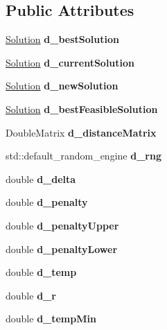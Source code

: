 \subsection*{Public Attributes}
\begin{DoxyCompactItemize}
\item 
\mbox{\label{class_env_a200b43f8ef6487fd256326a549616e78}} 
\hyperlink{class_solution}{Solution} {\bfseries d\+\_\+best\+Solution}
\item 
\mbox{\label{class_env_a60f53202173a69954e643ef46f16062f}} 
\hyperlink{class_solution}{Solution} {\bfseries d\+\_\+current\+Solution}
\item 
\mbox{\label{class_env_a6109a75656bf4b55567e57369d7b5aa5}} 
\hyperlink{class_solution}{Solution} {\bfseries d\+\_\+new\+Solution}
\item 
\mbox{\label{class_env_a639c27f323c898cb9821f4c64b1a055a}} 
\hyperlink{class_solution}{Solution} {\bfseries d\+\_\+best\+Feasible\+Solution}
\item 
\mbox{\label{class_env_a2686d42335dbafb9c10ebdbe6362e613}} 
Double\+Matrix {\bfseries d\+\_\+distance\+Matrix}
\item 
\mbox{\label{class_env_acde21783d6aed785a78cf914a7215383}} 
std\+::default\+\_\+random\+\_\+engine {\bfseries d\+\_\+rng}
\item 
\mbox{\label{class_env_a356dd226bf831c283818b459d66224c4}} 
double {\bfseries d\+\_\+delta}
\item 
\mbox{\label{class_env_a75f5662133f2d29d710c2bf2e2a34229}} 
double {\bfseries d\+\_\+penalty}
\item 
\mbox{\label{class_env_aa6ed2cae83f5d2e6ef14235fad4e050b}} 
double {\bfseries d\+\_\+penalty\+Upper}
\item 
\mbox{\label{class_env_a0524d57e12d574d482af272ce82c95ec}} 
double {\bfseries d\+\_\+penalty\+Lower}
\item 
\mbox{\label{class_env_a629686cbb29294979039c2adb9f19f66}} 
double {\bfseries d\+\_\+temp}
\item 
\mbox{\label{class_env_a8642169aafd7eca86c9ecdcccfdb12f2}} 
double {\bfseries d\+\_\+r}
\item 
\mbox{\label{class_env_a67d0d9d6323ec31b3fa226856afaf93e}} 
double {\bfseries d\+\_\+temp\+Min}
\end{DoxyCompactItemize}
